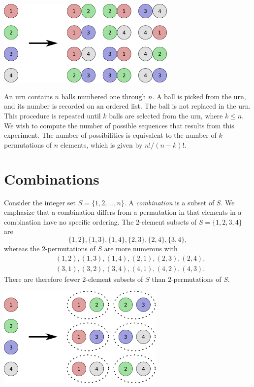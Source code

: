 \begin{center}
\includegraphics[height=4.215cm]{Figures/4Chapter/kpermutation}
\end{center}

\begin{example}
An urn contains $n$ balls numbered one through $n$.
A ball is picked from the urn, and its number is recorded on an ordered list.
The ball is not replaced in the urn.
This procedure is repeated until $k$ balls are selected from the urn, where $k \leq n$.
We wish to compute the number of possible sequences that results from this experiment.
The number of possibilities is equivalent to the number of $k$-permutations of $n$ elements, which is given by $n! / (n-k)!$.
\end{example}


\section{Combinations}

Consider the integer set $S = \{ 1, 2, \ldots, n \}$.
A \emph{combination} is a subset of $S$.
We emphasize that a combination differs from a permutation in that elements in a combination have no specific ordering.
The $2$-element subsets of $S = \{ 1, 2, 3, 4 \}$ are
\begin{equation*}
\{ 1, 2 \}, \{ 1, 3 \}, \{ 1, 4 \}, \{ 2, 3 \}, \{ 2, 4 \}, \{ 3, 4 \} ,
\end{equation*}
whereas the $2$-permutations of $S$ are more numerous with
\begin{equation*}
\begin{split}
&( 1, 2 ), ( 1, 3 ), ( 1, 4 ), ( 2, 1 ), ( 2, 3 ), ( 2, 4 ), \\
&( 3, 1 ), ( 3, 2 ), ( 3, 4 ), ( 4, 1 ), ( 4, 2 ), ( 4, 3 ) .
\end{split}
\end{equation*}
There are therefore fewer $2$-element subsets of $S$ than $2$-permutations of $S$.

\begin{center}
\includegraphics[height=4.95cm]{Figures/4Chapter/combination}
\end{center}

